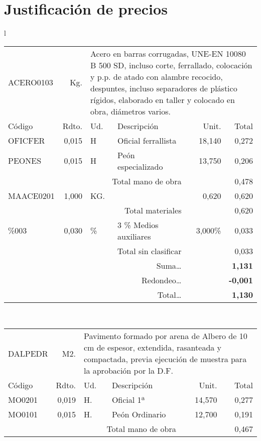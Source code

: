 \documentclass{book}%
\begin{document}
%
\normalsize%
\part{Justificación de precios}%
\label{sec:Justificacindeprecios}%
\small%
\begin{longtable}{l}%
\begin{tabular}{l r l p{60mm} r r}%
ACERO0103&Kg.&\multicolumn{4}{p{95mm}}{Acero en barras corrugadas, UNE{-}EN 10080 B 500 SD, incluso corte, ferrallado, colocación y p.p. de atado con alambre recocido, despuntes, incluso separadores de plástico rígidos, elaborado en taller y colocado en obra, diámetros varios.}\\%
Código&Rdto.&Ud.&Descripción&Unit.&Total\\%
\hline%
OFICFER&     0,015&H&Oficial ferrallista&    18,140&     0,272\\%
PEONES&     0,015&H&Peón especializado&    13,750&     0,206\\%
\multicolumn{4}{r}{Total mano de obra}&&     0,478\\%
MAACE0201&     1,000&KG.&&     0,620&     0,620\\%
\multicolumn{4}{r}{Total materiales}&&     0,620\\%
\%003&     0,030&\%&3 \% Medios auxiliares&     3,000\%&     0,033\\%
\multicolumn{4}{r}{Total sin clasificar}&&     0,033\\%
\multicolumn{4}{r}{Suma\ldots}&\multicolumn{2}{r}{\textbf{     1,131}}\\%
\multicolumn{4}{r}{Redondeo\ldots}&\multicolumn{2}{r}{\textbf{    {-}0,001}}\\%
\multicolumn{4}{r}{Total\ldots}&\multicolumn{2}{r}{\textbf{     1,130}}\\%
\end{tabular}\\%
\begin{tabular}{l r l p{60mm} r r}%
DALPEDR&M2.&\multicolumn{4}{p{95mm}}{Pavimento formado por arena de Albero de 10 cm de espesor, extendida, rasanteada y compactada, previa ejecución de muestra para la aprobación por la D.F.}\\%
Código&Rdto.&Ud.&Descripción&Unit.&Total\\%
\hline%
MO0201&     0,019&H.&Oficial 1ª&    14,570&     0,277\\%
MO0101&     0,015&H.&Peón Ordinario&    12,700&     0,191\\%
\multicolumn{4}{r}{Total mano de obra}&&     0,467\\%

\end{tabular}
\end{longtable}
\end{document}
